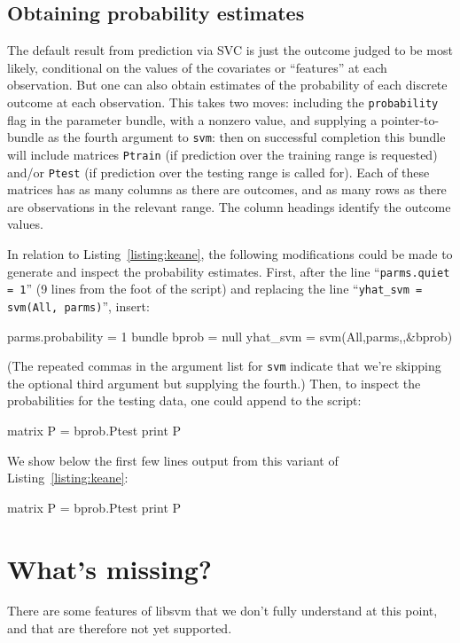 \documentclass{article}
\begin{document}
\subsection{Obtaining probability estimates}
\label{sec:SVC-probs}

The default result from prediction via SVC is just the outcome judged
to be most likely, conditional on the values of the covariates or
``features'' at each observation. But one can also obtain estimates of
the probability of each discrete outcome at each observation. This
takes two moves: including the \texttt{probability} flag in the
parameter bundle, with a nonzero value, and supplying a
pointer-to-bundle as the fourth argument to \texttt{svm}: then on
successful completion this bundle will include matrices
\texttt{Ptrain} (if prediction over the training range is requested)
and/or \texttt{Ptest} (if prediction over the testing range is called
for). Each of these matrices has as many columns as there are
outcomes, and as many rows as there are observations in the relevant
range. The column headings identify the outcome values.

In relation to Listing~\ref{listing:keane}, the following
modifications could be made to generate and inspect the probability
estimates. First, after the line ``\texttt{parms.quiet = 1}'' (9 lines
from the foot of the script) and replacing the line
``\texttt{yhat\_svm = svm(All, parms)}'', insert:
%
\begin{code}
parms.probability = 1
bundle bprob = null
yhat_svm = svm(All,parms,,&bprob)
\end{code}
(The repeated commas in the argument list for \texttt{svm} indicate
that we're skipping the optional third argument but supplying the
fourth.) Then, to inspect the probabilities for the testing
data, one could append to the script:
%
\begin{code}
matrix P = bprob.Ptest
print P
\end{code}
%
We show below the first few lines output from this variant of
Listing~\ref{listing:keane}:
%
\begin{code}
matrix P = bprob.Ptest
print P
\end{code}
%

\section{What's missing?}
\label{sec:missing}

There are some features of \textsf{libsvm} that we don't fully
understand at this point, and that are therefore not yet supported.
\end{document}
